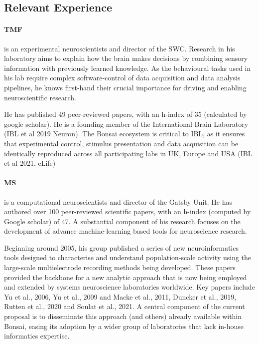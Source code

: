 
\subsection{Relevant Experience}

\paragraph{TMF} is an experimental
neuroscientists and director of the SWC. Research in his laboratory aims to
explain how the brain makes decisions by combining sensory information with
previously learned knowledge.  As the behavioural tasks used in his lab require
complex software-control of data acquisition and data analysis pipelines, he
knows first-hand their crucial importance for driving and enabling
neuroscientific research.

He has published 49 peer-reviewed papers, with an h-index of 35 (calculated by
google scholar).  He is a founding member of the International Brain Laboratory
(IBL et al 2019 Neuron). The Bonsai ecosystem is critical to IBL, as it ensures
that experimental control, stimulus presentation and data acquisition can be
identically reproduced across all participating labs in UK, Europe and USA (IBL
et al 2021, eLife)

\paragraph{MS} is a computational neuroscientists and director of the Gatsby
Unit. He has authored over 100 peer-reviewed scientific papers, with an h-index
(computed by Google scholar) of 47. A substantial component of his research
focuses on the development of advance machine-learning based tools for
neuroscience research.

Beginning around 2005, his group published a series of new neuroinformatics
tools designed to characterise and understand population-scale activity using
the large-scale multielectrode recording methods being developed. These papers
provided the backbone for a new analytic approach that is now being employed
and extended by systems neuroscience laboratories worldwide.
%
Key papers include Yu et al., 2006, Yu et al., 2009 and Macke et al., 2011,
Duncker et al., 2019, Rutten et al., 2020 and Soulat et al., 2021.
%
A central component of the current proposal is to disseminate this approach
(and others) already available within Bonsai, easing its adoption by a wider
group of laboratories that lack in-house informatics expertise.

